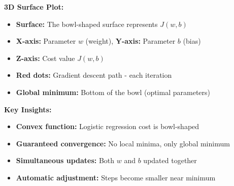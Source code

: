 \documentclass[11pt,a4paper]{article}
\theoremstyle{definition}
\theoremstyle{remark}
\begin{document}
\begin{intuition}
\textbf{3D Surface Plot:}
\begin{itemize}
    \item \textbf{Surface:} The bowl-shaped surface represents $J(w,b)$
    \item \textbf{X-axis:} Parameter $w$ (weight), \textbf{Y-axis:} Parameter $b$ (bias)
    \item \textbf{Z-axis:} Cost value $J(w,b)$
    \item \textbf{Red dots:} Gradient descent path - each iteration
    \item \textbf{Global minimum:} Bottom of the bowl (optimal parameters)
\end{itemize}

\textbf{Key Insights:}
\begin{itemize}
    \item \textbf{Convex function:} Logistic regression cost is bowl-shaped
    \item \textbf{Guaranteed convergence:} No local minima, only global minimum
    \item \textbf{Simultaneous updates:} Both $w$ and $b$ updated together
    \item \textbf{Automatic adjustment:} Steps become smaller near minimum
\end{itemize}
\end{intuition}

\vspace{0.4cm}
\end{document}
